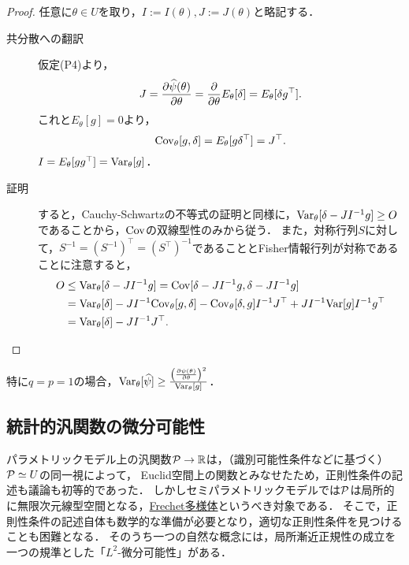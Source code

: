\documentclass[uplatex, dvipdfmx]{jsarticle}
\begin{document}
\begin{proof}
    任意に$\theta\in U$を取り，$I:=I(\theta),J:=J(\theta)$と略記する．
    \begin{description}
        \item[共分散への翻訳] 仮定(P4)より，
        \[J=\pp{\wh{\psi}(\theta)}{\theta}=\pp{}{\theta}E_\theta[\delta]=E_\theta[\delta g^\top].\]
        これと$E_\theta[g]=0$より，
        \[\Cov_\theta[g,\delta]=E_\theta[g\delta^\top]=J^\top.\]
        $I=E_\theta[gg^\top]=\Var_\theta[g]$．
        \item[証明] すると，Cauchy-Schwartzの不等式の証明と同様に，$\Var_\theta[\delta-JI^{-1}g]\ge O$であることから，$\Cov$の双線型性のみから従う．
        また，対称行列$S$に対して，$S^{-1}=(S^{-1})^\top=(S^\top)^{-1}$であることとFisher情報行列が対称であることに注意すると，
        \begin{align*}
            O&\le\Var_\theta[\delta-JI^{-1}g]=\Cov[\delta-JI^{-1}g,\delta-JI^{-1}g]\\
            &=\Var_\theta[\delta]-JI^{-1}\Cov_\theta[g,\delta]-\Cov_\theta[\delta,g]I^{-1} J^\top+JI^{-1}\Var[g]I^{-1}g^\top\\
            &=\Var_\theta[\delta]-JI^{-1}J^\top.
        \end{align*}
    \end{description}
\end{proof}


\begin{corollary}\label{cor-Cramer-Rao}
    特に$q=p=1$の場合，$\Var_\theta[\wh{\psi}]\ge\frac{\paren{\pp{\psi(\theta)}{\theta}}^2}{\Var_\theta[g]}$．
\end{corollary}

\subsection{統計的汎関数の微分可能性}

\begin{tcolorbox}[colframe=ForestGreen, colback=ForestGreen!10!white,breakable,colbacktitle=ForestGreen!40!white,coltitle=black,fonttitle=\bfseries\sffamily,
title=]
    パラメトリックモデル上の汎関数$\P\to\R$は，（識別可能性条件などに基づく）$\P\simeq U$の同一視によって，
    Euclid空間上の関数とみなせたため，正則性条件の記述も議論も初等的であった．
    しかしセミパラメトリックモデルでは$\P$は局所的に無限次元線型空間となる，\href{https://ncatlab.org/nlab/show/Fr%C3%A9chet+manifold}{Frechet多様体}というべき対象である．
    そこで，正則性条件の記述自体も数学的な準備が必要となり，適切な正則性条件を見つけることも困難となる．
    そのうち一つの自然な概念には，局所漸近正規性の成立を一つの規準とした「$L^2$-微分可能性」がある．
\end{tcolorbox}
\end{document}
